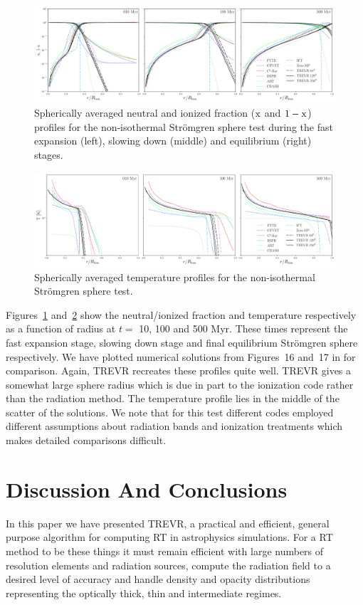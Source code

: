 \documentclass[fleq,usenatbib]{mnras}
\newcommand{\acro}{TREVR}
\newcommand{\strom}{Str\"omgren}
\begin{document}
{\begin{figure}
\includegraphics[width=0.95\linewidth]{Figures/strom_fraction.pdf}
\caption{Spherically averaged neutral and ionized fraction 
($\rm x$ and $\rm 1-x$) profiles for the non-isothermal \strom{} sphere test 
during the fast expansion (left), slowing down (middle) and equilibrium 
(right) stages.}
\label{fig:stromtherm}
\end{figure}
\begin{figure}
\includegraphics[width=0.95\linewidth]{Figures/strom_temp.pdf}
\caption{Spherically averaged temperature profiles for the non-isothermal 
\strom{} sphere test.}
\label{fig:stromtemp}
\end{figure}
Figures~\ref{fig:stromtherm} and~\ref{fig:stromtemp} show the neutral/ionized 
fraction and temperature respectively as a function of radius at $t=$ 10, 100
and 500 Myr. These times represent the fast expansion stage, slowing down 
stage and final equilibrium \strom{} sphere respectively. We have plotted 
numerical solutions from Figures~16 and~17 in \cite{ilievEt06} for comparison. 
Again, \acro{} recreates these profiles quite well.
\acro{} gives a somewhat large sphere radius which is 
due in part to the ionization code rather than the radiation method.  
The temperature profile lies in the middle of the scatter of the 
\cite{ilievEt06} solutions.  We note that for this test different codes employed
different assumptions about radiation bands and ionization treatments which
makes detailed comparisons difficult.

\section{Discussion And Conclusions}\label{sec:disc}
In this paper we have presented \acro{}, a practical and efficient, general 
purpose algorithm for computing RT in astrophysics simulations. For a RT 
method to be these things it must remain efficient with large numbers of 
resolution elements and radiation sources, compute the radiation field to a 
desired level of accuracy and handle density and opacity distributions 
representing the optically thick, thin and intermediate regimes.

}
\end{document}
